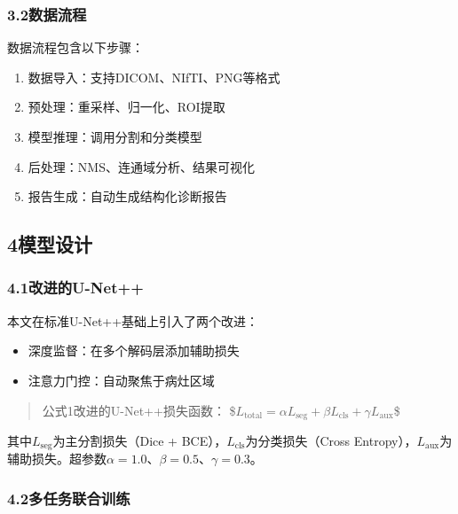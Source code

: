 \documentclass{harryopo-paper}
\begin{document}
\subsubsection*{3.2数据流程}

数据流程包含以下步骤：

\begin{enumerate}
  \item {\fzht 数据导入}：支持DICOM、NIfTI、PNG等格式
  \item {\fzht 预处理}：重采样、归一化、ROI提取
  \item {\fzht 模型推理}：调用分割和分类模型
  \item {\fzht 后处理}：NMS、连通域分析、结果可视化
  \item {\fzht 报告生成}：自动生成结构化诊断报告
\end{enumerate}

\subsection*{4模型设计}

\subsubsection*{4.1改进的U-Net++}

本文在标准U-Net++基础上引入了两个改进：

\begin{itemize}
  \item {\fzht 深度监督}：在多个解码层添加辅助损失
  \item {\fzht 注意力门控}：自动聚焦于病灶区域
\end{itemize}

\begin{quote}
{\fzht 公式1}改进的U-Net++损失函数：
\$$L_{\text{total}} = \alpha L_{\text{seg}} + \beta L_{\text{cls}} + \gamma L_{\text{aux}}$\$
\end{quote}

其中$L_{\text{seg}}$为主分割损失（Dice + BCE），$L_{\text{cls}}$为分类损失（Cross Entropy），$L_{\text{aux}}$为辅助损失。超参数$\alpha = 1.0$、$\beta = 0.5$、$\gamma = 0.3$。

\subsubsection*{4.2多任务联合训练}
\end{document}

